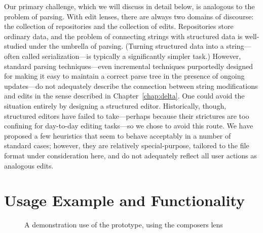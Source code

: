 Our primary challenge, which we will discuss in detail below, is analogous
to the problem of parsing. With edit lenses, there are always two domains of
discourse: the collection of repositories and the collection of edits.
Repositories store ordinary data, and the problem of connecting strings with
structured data is well-studied under the umbrella of parsing. (Turning
structured data into a string---often called serialization---is typically a
significantly simpler task.) However, standard parsing techniques---even
incremental techniques purportedly designed for making it easy to maintain a
correct parse tree in the presence of ongoing updates---do not adequately
describe the connection between string modifications and edits in the sense
described in Chapter~\ref{chap:delta}. One could avoid the situation
entirely by designing a structured editor. Historically, though, structured
editors have failed to take---perhaps because their strictures are too
confining for day-to-day editing tasks---so we chose to avoid this route. We
have proposed a few heuristics that seem to behave acceptably in a number of
standard cases; however, they are relatively special-purpose, tailored to
the file format under consideration here, and do not adequately reflect all
user actions as analogous edits.

\section{Usage Example and Functionality}
\label{sec:impl-usage}

\begin{figure}
    \centering
    \hfil
    \vspace{4ex}

    \hfil
    \vspace{4ex}

    \hfil
    \vspace{4ex}

    \hfil
    \vspace{4ex}

    \caption{A demonstration use of the prototype, using the composers lens}
    \label{fig:prototype-screenshots}
\end{figure}


